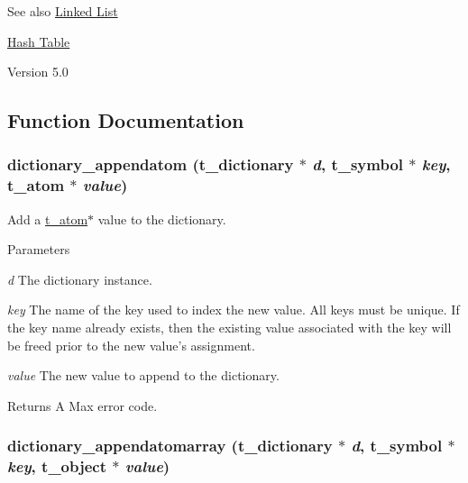 \begin{DoxySeeAlso}{See also}
\hyperlink{group__linklist}{Linked List} 

\hyperlink{group__hashtab}{Hash Table}
\end{DoxySeeAlso}
\begin{DoxyVersion}{Version}
5.0 
\end{DoxyVersion}


\subsection{Function Documentation}
\hypertarget{group__dictionary_ga22f5a417a6290c508d29196c3c6d6d58}{
\subsubsection[{dictionary\_\-appendatom}]{ dictionary\_\-appendatom ({\bf t\_\-dictionary} $\ast$ {\em d}, \/  {\bf t\_\-symbol} $\ast$ {\em key}, \/  {\bf t\_\-atom} $\ast$ {\em value})}}
\label{group__dictionary_ga22f5a417a6290c508d29196c3c6d6d58}


Add a \hyperlink{structt__atom}{t\_\-atom}$\ast$ value to the dictionary. 
\begin{DoxyParams}{Parameters}
\item[{\em d}]The dictionary instance. \item[{\em key}]The name of the key used to index the new value. All keys must be unique. If the key name already exists, then the existing value associated with the key will be freed prior to the new value's assignment. \item[{\em value}]The new value to append to the dictionary. \end{DoxyParams}
\begin{DoxyReturn}{Returns}
A Max error code. 
\end{DoxyReturn}
\hypertarget{group__dictionary_gac1f0f17da56b71ef6f21c972535ee609}{
\subsubsection[{dictionary\_\-appendatomarray}]{ dictionary\_\-appendatomarray ({\bf t\_\-dictionary} $\ast$ {\em d}, \/  {\bf t\_\-symbol} $\ast$ {\em key}, \/  {\bf t\_\-object} $\ast$ {\em value})}}
\label{group__dictionary_gac1f0f17da56b71ef6f21c972535ee609}


